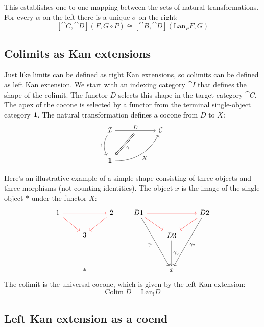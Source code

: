 \documentclass[DaoFP]{subfiles}
\begin{document}
This establishes one-to-one mapping between the sets of natural transformations. For every $\alpha$ on the left there is a unique $\sigma$ on the right:
\[  [\cat C, \cat D] (F, G \circ P) \cong [\cat B, \cat D](\text{Lan}_P F , G)  \]

\subsection{Colimits as Kan extensions}

Just like limits can be defined as right Kan extensions, so colimits can be defined as left Kan extension. We start with an indexing category $\cat I$ that defines the shape of the colimit. The functor $D$ selects this shape in the target category $\cat C$. The apex of the cocone is selected by a functor from the terminal single-object category $\mathbf{1}$. The natural transformation defines a cocone from $D$ to $X$:
\[
 \begin{tikzcd} [row sep=1cm, column sep=1cm]
 \cat I
 \arrow[rr, "D", "" {name=ID, below} ]
 \arrow[d, bend right, "!"']
 && \cat C
 \\
 \Cat 1
  \arrow[urr, bend right, "X"']
 \arrow[Rightarrow, "\gamma",  from=ID]
 \end{tikzcd}
\]

Here's an illustrative example of a simple shape consisting of three objects and three morphisms (not counting identities). The object $x$ is the image of the single object $*$ under the functor $X$:
\[
 \begin{tikzcd}
1 
\arrow[rr, red]
\arrow[rd, red]
&& 2
\arrow[dl, red]
\\
& 3
\\
\\
& *
 \end{tikzcd}
 \qquad
 \begin{tikzcd}
D 1 
\arrow[rr, red]
\arrow[rd, red]
\arrow[dddr, "\gamma_1"']
&& D 2
\arrow[dl, red]
\arrow[dddl, "\gamma_2"]
\\
& D 3
\arrow[dd, "\gamma_3"]
\\
\\
&x
 \end{tikzcd}
 \]
The colimit is the universal cocone, which is given by the left Kan extension:
\[ \text{Colim}\; D = \text{Lan}_! D \]



\subsection{Left Kan extension as a coend}
\end{document}
